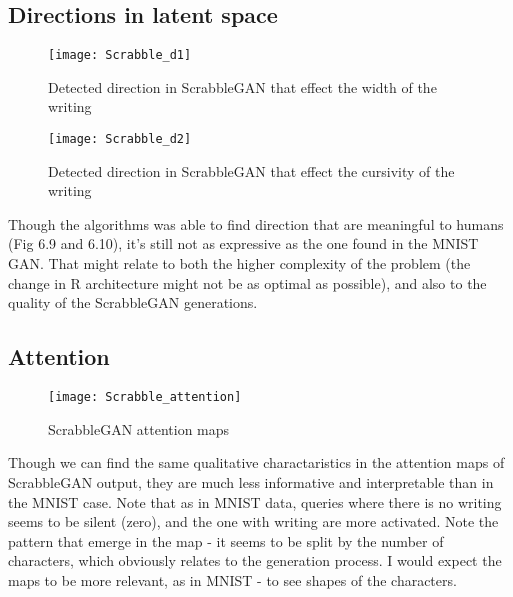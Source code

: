 \subsection{Directions in latent space}



\begin{figure}[h]
\centering
\texttt{[image: Scrabble\_d1]}
\caption{Detected direction in ScrabbleGAN that effect the width of the writing}
\label{fig:x cubed graph}
\end{figure}

\begin{figure}[h]
\centering
\texttt{[image: Scrabble\_d2]}
\caption{Detected direction in ScrabbleGAN that effect the cursivity of the writing}
\label{fig:x cubed graph}
\end{figure}


Though the algorithms was able to find direction that are meaningful to humans (Fig 6.9 and 6.10), it's still not as expressive as the one found in the MNIST GAN. That might relate to both the higher complexity of the problem (the change in R architecture might not be as optimal as possible), and also to the quality of the ScrabbleGAN generations.


\subsection{Attention}


\begin{figure}[h]
\centering
\texttt{[image: Scrabble\_attention]}
\caption{ScrabbleGAN attention maps}
\label{fig:x cubed graph}
\end{figure}


Though we can find the same qualitative charactaristics in the attention maps of ScrabbleGAN output, they are much less informative and interpretable than in the MNIST case.
Note that as in MNIST data, queries where there is no writing seems to be silent (zero), and the one with writing are more activated.
Note the pattern that emerge in the map - it seems to be split by the number of characters, which obviously relates to the generation process. I would expect the maps to be more relevant, as in MNIST - to see shapes of the characters.


